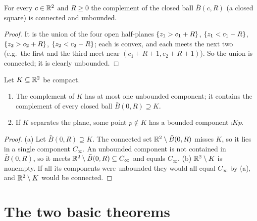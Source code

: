 
\begin{lemma}\label{lem:compl-square}
For every $c\in\mathbb{R}^2$ and $R\ge0$ the complement of the closed ball $\bar B(c,R)$ (a closed square) is
connected and unbounded.
\end{lemma}

\begin{proof}
It is the union of the four open half-planes $\left\{ z_1>c_1+R \right\}$, $\left\{ z_1<c_1-R \right\}$,
$\left\{ z_2>c_2+R \right\}$, $\left\{ z_2<c_2-R \right\}$; each is convex, and each meets the next two (e.g.\ the first
and the third meet near $(c_1+R+1,c_2+R+1)$). So the union is connected; it is clearly unbounded.
\end{proof}


\begin{lemma}\label{lem:unbounded-comp}
Let $K\subseteq\mathbb{R}^2$ be compact.
\begin{enumerate}[label=(\alph*)]
\item The complement of $K$ has at most one unbounded component; it contains the complement of
every closed ball $\bar B(0,R)\supseteq K$.
\item If $K$ separates the plane, some point $p\notin K$ has a bounded component $\comp Kp$.
\end{enumerate}
\end{lemma}

\begin{proof}
(a) Let $\bar B(0,R)\supseteq K$. The connected set $\mathbb{R}^2\setminus\bar B(0,R)$ misses $K$, so it lies
in a single component $C_\infty$. An unbounded component is not contained in $\bar B(0,R)$, so it
meets $\mathbb{R}^2\setminus\bar B(0,R)\subseteq C_\infty$ and equals $C_\infty$.
(b) $\mathbb{R}^2\setminus K$ is nonempty. If all its components were unbounded they would all equal
$C_\infty$ by (a), and $\mathbb{R}^2\setminus K$ would be connected.
\end{proof}


\section{The two basic theorems}


